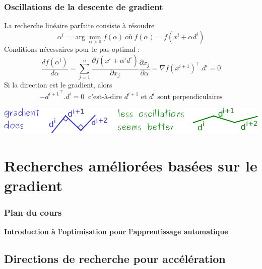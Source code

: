 \documentclass[12pt]{beamer}
\begin{document}
\begin{frame}
\frametitle{Oscillations de la descente de gradient} 
La recherche linéaire parfaite consiste à résoudre
\begin{equation*}
\alpha^i = \arg\min_{\alpha>0} f(\alpha) ~\text{où}~ f(\alpha) = f(x^i + \alpha d^i) 
\end{equation*}
Conditions nécessaires pour le pas optimal : 
\begin{equation*}
\frac{df(\alpha^i)}{d\alpha} = \sum_{j=1}^n \frac{\partial f(x^i + \alpha^i d^i)}{\partial x_j} \frac{\partial x_j}{\partial \alpha}
= \nabla f(x^{i+1})^\top . d^i = 0
\end{equation*}
Si la direction est le gradient, alors
\begin{equation*}
-{d^{i+1}}^\top . d^i = 0 ~\text{ c’est-à-dire } d^{i+1} \text{ et } d^i \text{ sont perpendiculaires}
\end{equation*}
\begin{center}
\includegraphics[width=\textwidth]{oscillations-crop.pdf} 
\end{center}
\end{frame}

\section{Recherches améliorées basées sur le gradient}

\begin{frame}%
\frametitle{Plan du cours} 
\begin{multicols}{2}
\begin{center} \textbf{Introduction à l’optimisation pour l’apprentissage automatique} \end{center}
\tableofcontents[currentsection]
\end{multicols}
\end{frame}


\subsection{Directions de recherche pour accélération}
\end{document}
